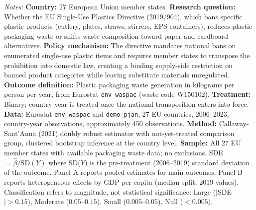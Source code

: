 \begin{table}[t]
\begin{tablenotes}[flushleft]
\item \textit{Notes:} \textbf{Country:} 27 European Union member states. \textbf{Research question:} Whether the EU Single-Use Plastics Directive (2019/904), which bans specific plastic products (cutlery, plates, straws, stirrers, EPS containers), reduces plastic packaging waste or shifts waste composition toward paper and cardboard alternatives. \textbf{Policy mechanism:} The directive mandates national bans on enumerated single-use plastic items and requires member states to transpose the prohibition into domestic law, creating a binding supply-side restriction on banned product categories while leaving substitute materials unregulated. \textbf{Outcome definition:} Plastic packaging waste generation in kilograms per person per year, from Eurostat \texttt{env\_waspac} (waste code W150102). \textbf{Treatment:} Binary; country-year is treated once the national transposition enters into force. \textbf{Data:} Eurostat \texttt{env\_waspac} and \texttt{demo\_pjan}, 27 EU countries, 2006--2023, country-year observations, approximately 450 observations. \textbf{Method:} Callaway-Sant'Anna (2021) doubly robust estimator with not-yet-treated comparison group, clustered bootstrap inference at the country level. \textbf{Sample:} All 27 EU member states with available packaging waste data; no exclusions. SDE $= \hat{\beta} / \text{SD}(Y)$ where SD($Y$) is the pre-treatment (2006--2019) standard deviation of the outcome. Panel A reports pooled estimates for main outcomes. Panel B reports heterogeneous effects by GDP per capita (median split, 2019 values). Classification refers to magnitude, not statistical significance: Large ($|$SDE$| > 0.15$), Moderate ($0.05$--$0.15$), Small ($0.005$--$0.05$), Null ($< 0.005$).
\end{tablenotes}
\end{table}
